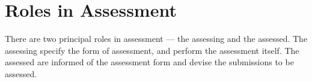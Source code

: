
\section{Roles in Assessment}

There are two principal roles in assessment --- the assessing and the assessed.
The assessing specify the form of assessment, and perform the assessment
itself. The assessed are informed of the assessment form and devise the
submissions to be assessed.

